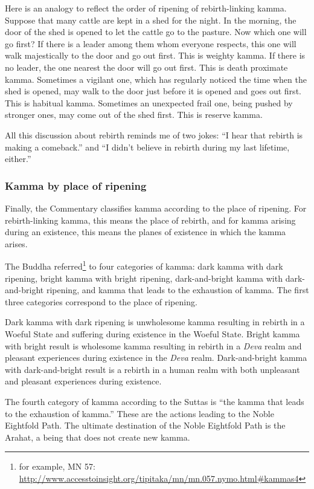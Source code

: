 Here is an analogy to reflect the order of ripening of rebirth-linking kamma. Suppose that many cattle are kept in a shed for the night. In the morning, the door of the shed is opened to let the cattle go to the pasture. Now which one will go first? If there is a leader among them whom everyone respects, this one will walk majestically to the door and go out first. This is weighty kamma. If there is no leader, the one nearest the door will go out first. This is death proximate kamma. Sometimes a vigilant one, which has regularly noticed the time when the shed is opened, may walk to the door just before it is opened and goes out first. This is habitual kamma. Sometimes an unexpected frail one, being pushed by stronger ones, may come out of the shed first. This is reserve kamma.

All this discussion about rebirth reminds me of two jokes: “I hear that rebirth is making a comeback.” and “I didn’t believe in rebirth during my last lifetime, either.”

\pagebreak

\subsubsection*{Kamma by place of ripening}

Finally, the Commentary classifies kamma according to the place of ripening. For rebirth-linking kamma, this means the place of rebirth, and for kamma arising during an existence, this means the planes of existence in which the kamma arises.

The Buddha referred\footnote{for example, MN 57: \url{http://www.accesstoinsight.org/tipitaka/mn/mn.057.nymo.html\#kammas4}} to four categories of kamma: dark kamma with dark ripening, bright kamma with bright ripening, dark-and-bright kamma with dark-and-bright ripening, and kamma that leads to the exhaustion of kamma. The first three categories correspond to the place of ripening.

Dark kamma with dark ripening is unwholesome kamma resulting in rebirth in a Woeful State and suffering during existence in the Woeful State. Bright kamma with bright result is wholesome kamma resulting in rebirth in a \textit{Deva} realm and pleasant experiences during existence in the \textit{Deva} realm. Dark-and-bright kamma with dark-and-bright result is a rebirth in a human realm with both unpleasant and pleasant experiences during existence. 

The fourth category of kamma according to the Suttas is “the kamma that leads to the exhaustion of kamma.” These are the actions leading to the Noble Eightfold Path. The ultimate destination of the Noble Eightfold Path is the Arahat, a being that does not create new kamma.

